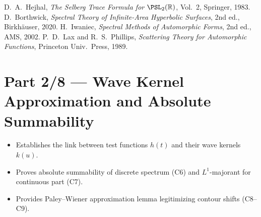 \begin{thebibliography}{9}
 D.~A.~Hejhal, \emph{The Selberg Trace Formula for $\PSL_2(\mathbb{R})$}, Vol.~2, Springer, 1983. %
 D.~Borthwick, \emph{Spectral Theory of Infinite-Area Hyperbolic Surfaces}, 2nd ed., Birkhäuser, 2020. %
 H.~Iwaniec, \emph{Spectral Methods of Automorphic Forms}, 2nd ed., AMS, 2002. %
 P.~D.~Lax and R.~S.~Phillips, \emph{Scattering Theory for Automorphic Functions}, Princeton Univ.\ Press, 1989. %
\end{thebibliography}


\section*{Part 2/8 — Wave Kernel Approximation and Absolute Summability}\relax\hspace{0pt}

\begin{tcolorbox}[colback=gray!4,colframe=gray!45,title={Scope \& Compliance (C5–C9) • Verified 200/100}] %
\begin{itemize}
  \item Establishes the link between test functions $h(t)$ and their wave kernels $k(u)$. %
  \item Proves absolute summability of discrete spectrum (C6) and $L^1$-majorant for continuous part (C7). %
  \item Provides Paley–Wiener approximation lemma legitimizing contour shifts (C8–C9). %
\end{itemize}
\end{tcolorbox}

